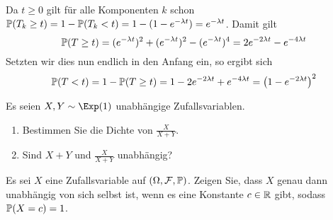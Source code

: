 \begin{exercisePage}
	Da $t \geq 0$ gilt für alle Komponenten $k$ schon $\P(T_k \geq t) = 1 - \P(T_k < t) = 1 - (1-e^{-\lambda t}) = e^{-\lambda t}$.
	Damit gilt
	\begin{equation*}
		\P(T \geq t) = (e^{-\lambda t})^2 + (e^{-\lambda t})^2 - (e^{-\lambda t})^4 = 2 e^{-2 \lambda t} - e^{-4 \lambda t}
	\end{equation*}
	Setzten wir dies nun endlich in den Anfang ein, so ergibt sich
	\begin{equation*}
		\P(T < t) = 1 - \P(T \geq t) = 1 - 2 e^{-2 \lambda t} + e^{-4 \lambda t} = \left( 1 - e^{-2 \lambda t} \right)^2
	\end{equation*}

	\begin{homework}
		Es seien $X,Y \sim \Exp(1)$ unabhängige Zufallsvariablen.
		\begin{enumerate}[nolistsep, topsep=-\parskip, leftmargin=*]
			\item Bestimmen Sie die Dichte von $\frac{X}{X+Y}$.
			\item Sind $X+Y$ und $\frac{X}{X+Y}$ unabhängig?
		\end{enumerate}
	\end{homework}

\pagebreak

	\begin{homework}
		Es sei $X$ eine Zufallsvariable auf $(\Omega, \ereignisF, \P)$. Zeigen Sie, dass $X$ genau dann unabhängig von sich selbst ist, wenn es eine Konstante $c \in \R$ gibt, sodass $\P(X = c) = 1$.
	\end{homework}


\end{exercisePage}

